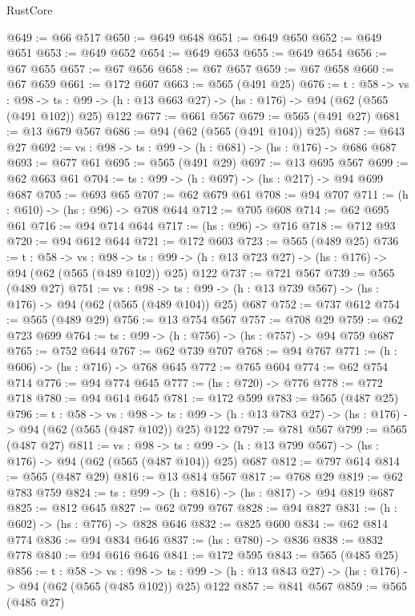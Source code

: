 \begin{lexlean}{RustCore}
\begin{coremodule}
@649 := @66 @517
@650 := @649 @648
@651 := @649 @650
@652 := @649 @651
@653 := @649 @652
@654 := @649 @653
@655 := @649 @654
@656 := @67 @655
@657 := @67 @656
@658 := @67 @657
@659 := @67 @658
@660 := @67 @659
@661 := @172 @607
@663 := @565 (@491 @25)
@676 := {t : @58} ->
  {vs : @98} ->
  {ts : @99} -> (h : @13 @663 @27) -> (hs : @176) -> @94 (@62 (@565 (@491 @102)) @25) @122
@677 := @661 @567
@679 := @565 (@491 @27)
@681 := @13 @679 @567
@686 := @94 (@62 (@565 (@491 @104)) @25)
@687 := @643 @27
@692 := {vs : @98} -> {ts : @99} -> (h : @681) -> (hs : @176) -> @686 @687
@693 := @677 @61
@695 := @565 (@491 @29)
@697 := @13 @695 @567
@699 := @62 @663 @61
@704 := {ts : @99} -> (h : @697) -> (hs : @217) -> @94 @699 @687
@705 := @693 @65
@707 := @62 @679 @61
@708 := @94 @707
@711 := (h : @610) -> (hs : @96) -> @708 @644
@712 := @705 @608
@714 := @62 @695 @61
@716 := @94 @714 @644
@717 := (hs : @96) -> @716
@718 := @712 @93
@720 := @94 @612 @644
@721 := @172 @603
@723 := @565 (@489 @25)
@736 := {t : @58} ->
  {vs : @98} ->
  {ts : @99} -> (h : @13 @723 @27) -> (hs : @176) -> @94 (@62 (@565 (@489 @102)) @25) @122
@737 := @721 @567
@739 := @565 (@489 @27)
@751 := {vs : @98} ->
  {ts : @99} -> (h : @13 @739 @567) -> (hs : @176) -> @94 (@62 (@565 (@489 @104)) @25) @687
@752 := @737 @612
@754 := @565 (@489 @29)
@756 := @13 @754 @567
@757 := @708 @29
@759 := @62 @723 @699
@764 := {ts : @99} -> (h : @756) -> (hs : @757) -> @94 @759 @687
@765 := @752 @644
@767 := @62 @739 @707
@768 := @94 @767
@771 := (h : @606) -> (hs : @716) -> @768 @645
@772 := @765 @604
@774 := @62 @754 @714
@776 := @94 @774 @645
@777 := (hs : @720) -> @776
@778 := @772 @718
@780 := @94 @614 @645
@781 := @172 @599
@783 := @565 (@487 @25)
@796 := {t : @58} ->
  {vs : @98} ->
  {ts : @99} -> (h : @13 @783 @27) -> (hs : @176) -> @94 (@62 (@565 (@487 @102)) @25) @122
@797 := @781 @567
@799 := @565 (@487 @27)
@811 := {vs : @98} ->
  {ts : @99} -> (h : @13 @799 @567) -> (hs : @176) -> @94 (@62 (@565 (@487 @104)) @25) @687
@812 := @797 @614
@814 := @565 (@487 @29)
@816 := @13 @814 @567
@817 := @768 @29
@819 := @62 @783 @759
@824 := {ts : @99} -> (h : @816) -> (hs : @817) -> @94 @819 @687
@825 := @812 @645
@827 := @62 @799 @767
@828 := @94 @827
@831 := (h : @602) -> (hs : @776) -> @828 @646
@832 := @825 @600
@834 := @62 @814 @774
@836 := @94 @834 @646
@837 := (hs : @780) -> @836
@838 := @832 @778
@840 := @94 @616 @646
@841 := @172 @595
@843 := @565 (@485 @25)
@856 := {t : @58} ->
  {vs : @98} ->
  {ts : @99} -> (h : @13 @843 @27) -> (hs : @176) -> @94 (@62 (@565 (@485 @102)) @25) @122
@857 := @841 @567
@859 := @565 (@485 @27)

\end{coremodule}
\end{lexlean}
